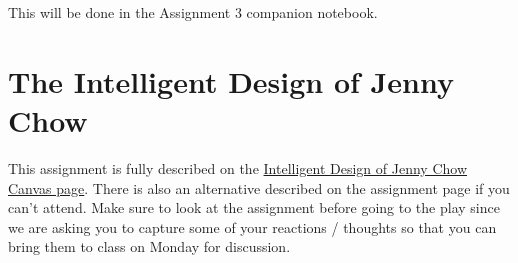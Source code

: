 \documentclass[assignment03_Solutions]{subfiles}
\begin{document}
\begin{externalresources}[(45 minutes)]
This will be done in the Assignment 3 companion notebook.
\end{externalresources}

\section{The Intelligent Design of Jenny Chow}

This assignment is fully described on the \href{https://canvas.instructure.com/courses/1659968/assignments/12785465?module_item_id=26196347}{Intelligent Design of Jenny Chow Canvas page}.  There is also an alternative described on the assignment page if you can't attend.  Make sure to look at the assignment before going to the play since we are asking you to capture some of your reactions / thoughts so that you can bring them to class on Monday for discussion.
\end{document}
